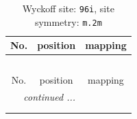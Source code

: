 \documentclass[fleqn,8pt]{jsarticle}
\begin{document}
\renewcommand{\arraystretch}{1.2}
\begin{longtable}{ccc}
\caption{Wyckoff site: {\tt 96i}, site symmetry: {\tt m.2m}}
 \\
 \hline \hline
No. & position & mapping \\ \hline \endfirsthead

\multicolumn{2}{l}{\tablename\ \thetable{}} \\
 \hline \hline
No. & position & mapping \\ \hline \endhead

 \hline \hline
\multicolumn{2}{r}{\footnotesize\it continued ...} \\ \endfoot

 \hline \hline
\multicolumn{2}{r}{} \\ \endlastfoot


\end{longtable}
\end{document}
